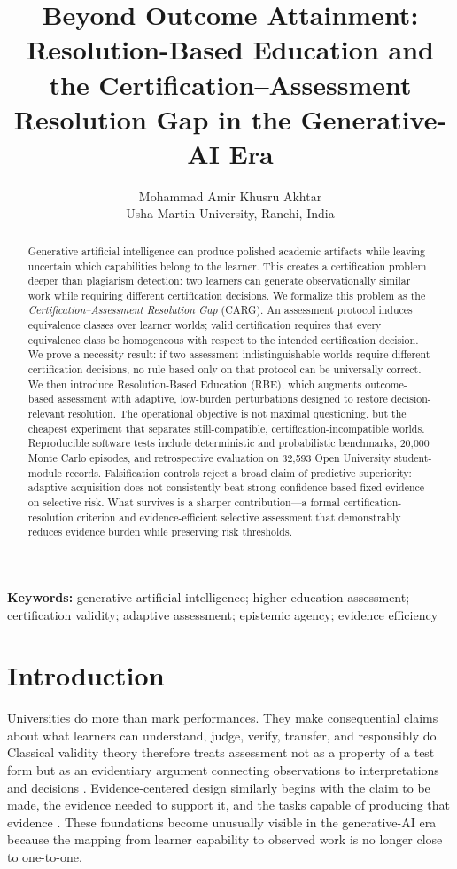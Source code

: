 \documentclass[11pt]{article}
\title{\textbf{Beyond Outcome Attainment: Resolution-Based Education and the Certification--Assessment Resolution Gap in the Generative-AI Era}}
\author{Mohammad Amir Khusru Akhtar\\Usha Martin University, Ranchi, India}
\date{}
\begin{document}
\maketitle

\begin{abstract}
Generative artificial intelligence can produce polished academic artifacts while leaving uncertain which capabilities belong to the learner. This creates a certification problem deeper than plagiarism detection: two learners can generate observationally similar work while requiring different certification decisions. We formalize this problem as the \emph{Certification--Assessment Resolution Gap} (CARG). An assessment protocol induces equivalence classes over learner worlds; valid certification requires that every equivalence class be homogeneous with respect to the intended certification decision. We prove a necessity result: if two assessment-indistinguishable worlds require different certification decisions, no rule based only on that protocol can be universally correct. We then introduce Resolution-Based Education (RBE), which augments outcome-based assessment with adaptive, low-burden perturbations designed to restore decision-relevant resolution. The operational objective is not maximal questioning, but the cheapest experiment that separates still-compatible, certification-incompatible worlds. Reproducible software tests include deterministic and probabilistic benchmarks, 20,000 Monte Carlo episodes, and retrospective evaluation on 32,593 Open University student-module records. Falsification controls reject a broad claim of predictive superiority: adaptive acquisition does not consistently beat strong confidence-based fixed evidence on selective risk. What survives is a sharper contribution---a formal certification-resolution criterion and evidence-efficient selective assessment that demonstrably reduces evidence burden while preserving risk thresholds.
\end{abstract}

\noindent\textbf{Keywords:} generative artificial intelligence; higher education assessment; certification validity; adaptive assessment; epistemic agency; evidence efficiency

\section{Introduction}
Universities do more than mark performances. They make consequential claims about what learners can understand, judge, verify, transfer, and responsibly do. Classical validity theory therefore treats assessment not as a property of a test form but as an evidentiary argument connecting observations to interpretations and decisions \parencite{messick1995validity}. Evidence-centered design similarly begins with the claim to be made, the evidence needed to support it, and the tasks capable of producing that evidence \parencite{mislevy2003ecd}. These foundations become unusually visible in the generative-AI era because the mapping from learner capability to observed work is no longer close to one-to-one.
\end{document}
